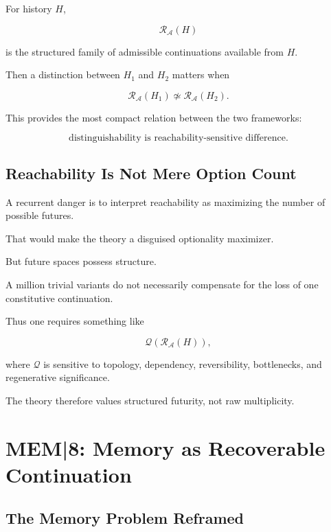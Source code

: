 \documentclass[11pt]{article}
\theoremstyle{remark}
\newcommand{\MEM}{\textsc{MEM|8}}
\newcommand{\Adm}{\mathcal{A}}
\newcommand{\Reach}{\mathcal{R}}
\begin{document}
For history $H$,

\begin{equation}
\Reach_{\Adm}(H)
\end{equation}

is the structured family of admissible continuations available from $H$.

Then a distinction between $H_1$ and $H_2$ matters when

\begin{equation}
\Reach_{\Adm}(H_1)
\not\simeq
\Reach_{\Adm}(H_2).
\end{equation}

This provides the most compact relation between the two frameworks:

\begin{equation}
\boxed{
\text{distinguishability is reachability-sensitive difference}.
}
\end{equation}

\subsection{Reachability Is Not Mere Option Count}

A recurrent danger is to interpret reachability as maximizing the number of possible futures.

That would make the theory a disguised optionality maximizer.

But future spaces possess structure.

A million trivial variants do not necessarily compensate for the loss of one constitutive continuation.

Thus one requires something like

\begin{equation}
\mathcal{Q}
(
\Reach_{\Adm}(H)
),
\end{equation}

where $\mathcal{Q}$ is sensitive to topology, dependency, reversibility, bottlenecks, and regenerative significance.

The theory therefore values structured futurity, not raw multiplicity.

\section{\MEM{}: Memory as Recoverable Continuation}

\subsection{The Memory Problem Reframed}
\end{document}
